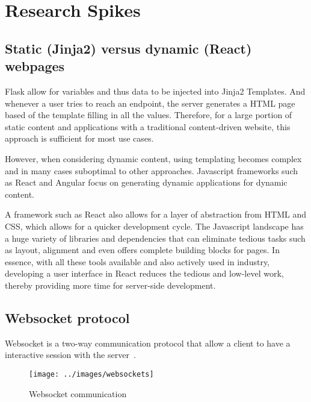 \clearpage


\section{Research Spikes}\label{sec:research-spikes}

\subsection{Static (Jinja2) versus dynamic (React) webpages}\label{subsec:static-versus-dynamic-webpages}

Flask allow for variables and thus data to be injected into Jinja2 Templates.
And whenever a user tries to reach an endpoint, the server generates a HTML page based of the template filling in all the values.
Therefore, for a large portion of static content and applications with a traditional content-driven website, this approach is sufficient for most use cases.

However, when considering dynamic content, using templating becomes complex and in many cases suboptimal to other approaches.
Javascript frameworks such as React and Angular focus on generating dynamic applications for dynamic content.

A framework such as React also allows for a layer of abstraction from HTML and CSS, which allows for a quicker development cycle.
The Javascript landscape has a huge variety of libraries and dependencies that can eliminate tedious tasks such as layout, alignment and even offers complete building blocks for pages.
In essence, with all these tools available and also actively used in industry, developing a user interface in React reduces the tedious and low-level work, thereby providing more time for server-side development.

\clearpage
\subsection{Websocket protocol}\label{subsec:websocket-protocol}

Websocket is a two-way communication protocol that allow a client to have a interactive session with the server~\cite{websocketMozilla}.

\begin{figure}[H]
    \centering
    \texttt{[image: ../images/websockets]}
    \caption{Websocket communication \cite{diaconu}}
    \label{fig:websocketCommunication}
\end{figure}


